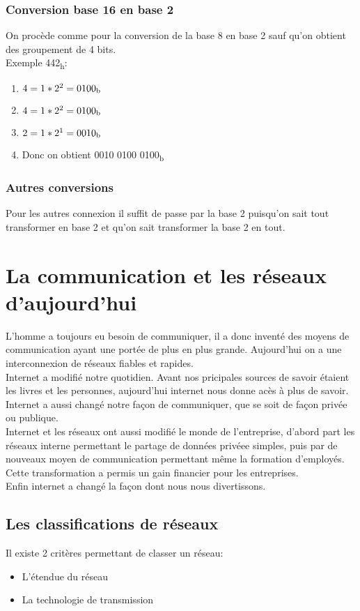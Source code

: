  \subsubsection{Conversion base 16 en base 2}
 On procède comme pour la conversion de la base 8 en base 2 sauf qu'on obtient des groupement de 4 bits.\\
 Exemple 442\textsubscript{h}:
\begin{enumerate}
	 \item $4 = 1*2^2 = 0100\textsubscript{b}$
	 \item $4 = 1*2^2 = 0100\textsubscript{b}$
	 \item $2 = 1*2^1 = 0010\textsubscript{b}$
	 \item Donc on obtient 0010 0100 0100\textsubscript{b}
 \end{enumerate}

 \subsubsection{Autres conversions}
 Pour les autres connexion il suffit de passe par la base 2 puisqu'on sait tout transformer en base 2 et qu'on sait transformer la base 2 en tout.

 \section{La communication et les réseaux d'aujourd'hui}
 L'homme a toujours eu besoin de communiquer, il a donc inventé des moyens de communication ayant une portée de plus en plus grande. Aujourd'hui on a une interconnexion de réseaux fiables et rapides.\\
 Internet a modifié notre quotidien. Avant nos pricipales sources de savoir étaient les livres et les personnes, aujourd'hui internet nous donne acès à plus de savoir.\\
 Internet a aussi changé notre façon de communiquer, que se soit de façon privée ou publique.\\
 Internet et les réseaux ont aussi modifié le monde de l'entreprise, d'abord part les réseaux interne permettant le partage de données privéee simples, puis par de nouveaux moyen de communication permettant même la formation d'employés. Cette transformation a permis un gain financier pour les entreprises.\\
 Enfin internet a changé la façon dont nous nous divertissons.

 \subsection{Les classifications de réseaux}
 Il existe 2 critères permettant de classer un réseau:
 \begin{itemize}
	 \item L'étendue du réseau
	 \item La technologie de transmission
 \end{itemize}
